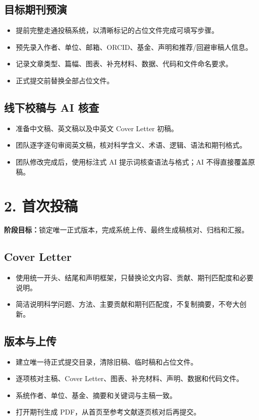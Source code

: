\documentclass[UTF8,11pt]{ctexart}
\begin{document}
\subsection{目标期刊预演}
\begin{itemize}
\item 提前完整走通投稿系统，以清晰标记的占位文件完成可填写步骤。
\item 预先录入作者、单位、邮箱、ORCID、基金、声明和推荐/回避审稿人信息。
\item 记录文章类型、篇幅、图表、补充材料、数据、代码和文件命名要求。
\item 正式提交前替换全部占位文件。
\end{itemize}
\subsection{线下校稿与 AI 核查}
\begin{itemize}
\item 准备中文稿、英文稿以及中英文 Cover Letter 初稿。
\item 团队逐字逐句审阅英文稿，核对科学含义、术语、逻辑、语法和期刊格式。
\item 团队修改完成后，使用标注式 AI 提示词核查语法与格式；AI 不得直接覆盖原稿。
\end{itemize}
\section{2. 首次投稿}
\textbf{阶段目标：}锁定唯一正式版本，完成系统上传、最终生成稿核对、归档和汇报。
\subsection{Cover Letter}
\begin{itemize}
\item 使用统一开头、结尾和声明框架，只替换论文内容、贡献、期刊匹配度和必要说明。
\item 简洁说明科学问题、方法、主要贡献和期刊匹配度，不复制摘要，不夸大创新。
\end{itemize}
\subsection{版本与上传}
\begin{itemize}
\item 建立唯一待正式提交目录，清除旧稿、临时稿和占位文件。
\item 逐项核对主稿、Cover Letter、图表、补充材料、声明、数据和代码文件。
\item 系统作者、单位、基金、摘要和关键词与主稿一致。
\item 打开期刊生成 PDF，从首页至参考文献逐页核对后再提交。
\end{itemize}
\end{document}

